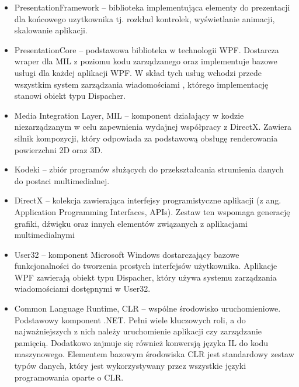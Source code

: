\begin{itemize}
	\item PresentationFramework – biblioteka implementująca elementy do prezentacji dla końcowego uzytkownika tj. rozkład kontrolek, wyświetlanie animacji, skalowanie aplikacji. 
	
	\item PresentationCore – podstawowa biblioteka w technologii WPF. Dostarcza wraper dla MIL z poziomu kodu zarządzanego oraz implementuje bazowe  usługi dla każdej aplikacji WPF. W skład tych usług wchodzi przede wszystkim system zarządzania wiadomościami , którego implementację stanowi obiekt typu Dispacher.  
	
	\item Media Integration Layer, MIL – komponent działający w kodzie niezarządzanym w celu zapewnienia wydajnej współpracy  z DirectX.   Zawiera silnik kompozycji, który odpowiada za  podstawową obsługę renderowania powierzchni 2D oraz 3D.
	
	\item Kodeki – zbiór programów służących do przekształcania strumienia danych do postaci multimedialnej.
	
	\item DirectX – kolekcja zawierająca interfejsy programistyczne aplikacji (z ang. Application Programming Interfaces, APIs). Zestaw ten  wspomaga generację grafiki, dźwięku oraz innych elementów związanych z aplikacjami multimedialnymi
	
	\item User32 – komponent Microsoft Windows dostarczający bazowe funkcjonalności do tworzenia prostych interfejsów użytkownika.  Aplikacje WPF zawierają obiekt typu Dispacher, który używa systemu zarządzania wiadomościami dostępnymi w User32.
	
	\item Common Language Runtime, CLR – wspólne środowisko uruchomieniowe. Podstawowy komponent .NET. Pełni wiele kluczowych roli, a do najważniejszych z nich należy uruchomienie aplikacji czy zarządzanie pamięcią. Dodatkowo zajmuje się również konwersją języka IL do kodu maszynowego. Elementem bazowym środowiska CLR jest standardowy zestaw typów danych, który jest wykorzystywany przez wszystkie języki programowania oparte o CLR. 
	
\end{itemize}

